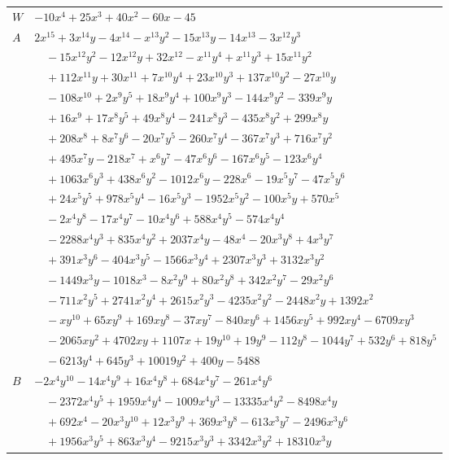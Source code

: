 \documentclass[11pt]{article}
\begin{document}
\begin{longtable}{@{}ll@{}}
$W$ & $-10x^{4}+25x^{3}+40x^{2}-60x-45$\\
$A$ & $2x^{15}+3x^{14}y-4x^{14}-x^{13}y^{2}-15x^{13}y-14x^{13}-3x^{12}y^{3}$\\
 & $\quad -15x^{12}y^{2}-12x^{12}y+32x^{12}-x^{11}y^{4}+x^{11}y^{3}+15x^{11}y^{2}$\\
 & $\quad +112x^{11}y+30x^{11}+7x^{10}y^{4}+23x^{10}y^{3}+137x^{10}y^{2}-27x^{10}y$\\
 & $\quad -108x^{10}+2x^{9}y^{5}+18x^{9}y^{4}+100x^{9}y^{3}-144x^{9}y^{2}-339x^{9}y$\\
 & $\quad +16x^{9}+17x^{8}y^{5}+49x^{8}y^{4}-241x^{8}y^{3}-435x^{8}y^{2}+299x^{8}y$\\
 & $\quad +208x^{8}+8x^{7}y^{6}-20x^{7}y^{5}-260x^{7}y^{4}-367x^{7}y^{3}+716x^{7}y^{2}$\\
 & $\quad +495x^{7}y-218x^{7}+x^{6}y^{7}-47x^{6}y^{6}-167x^{6}y^{5}-123x^{6}y^{4}$\\
 & $\quad +1063x^{6}y^{3}+438x^{6}y^{2}-1012x^{6}y-228x^{6}-19x^{5}y^{7}-47x^{5}y^{6}$\\
 & $\quad +24x^{5}y^{5}+978x^{5}y^{4}-16x^{5}y^{3}-1952x^{5}y^{2}-100x^{5}y+570x^{5}$\\
 & $\quad -2x^{4}y^{8}-17x^{4}y^{7}-10x^{4}y^{6}+588x^{4}y^{5}-574x^{4}y^{4}$\\
 & $\quad -2288x^{4}y^{3}+835x^{4}y^{2}+2037x^{4}y-48x^{4}-20x^{3}y^{8}+4x^{3}y^{7}$\\
 & $\quad +391x^{3}y^{6}-404x^{3}y^{5}-1566x^{3}y^{4}+2307x^{3}y^{3}+3132x^{3}y^{2}$\\
 & $\quad -1449x^{3}y-1018x^{3}-8x^{2}y^{9}+80x^{2}y^{8}+342x^{2}y^{7}-29x^{2}y^{6}$\\
 & $\quad -711x^{2}y^{5}+2741x^{2}y^{4}+2615x^{2}y^{3}-4235x^{2}y^{2}-2448x^{2}y+1392x^{2}$\\
 & $\quad -xy^{10}+65xy^{9}+169xy^{8}-37xy^{7}-840xy^{6}+1456xy^{5}+992xy^{4}-6709xy^{3}$\\
 & $\quad -2065xy^{2}+4702xy+1107x+19y^{10}+19y^{9}-112y^{8}-1044y^{7}+532y^{6}+818y^{5}$\\
 & $\quad -6213y^{4}+645y^{3}+10019y^{2}+400y-5488$\\
$B$ & $-2x^{4}y^{10}-14x^{4}y^{9}+16x^{4}y^{8}+684x^{4}y^{7}-261x^{4}y^{6}$\\
 & $\quad -2372x^{4}y^{5}+1959x^{4}y^{4}-1009x^{4}y^{3}-13335x^{4}y^{2}-8498x^{4}y$\\
 & $\quad +692x^{4}-20x^{3}y^{10}+12x^{3}y^{9}+369x^{3}y^{8}-613x^{3}y^{7}-2496x^{3}y^{6}$\\
 & $\quad +1956x^{3}y^{5}+863x^{3}y^{4}-9215x^{3}y^{3}+3342x^{3}y^{2}+18310x^{3}y$\\

\end{longtable}
\end{document}
